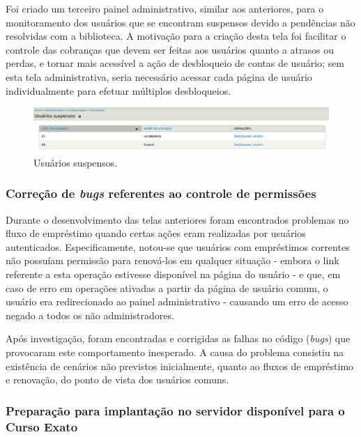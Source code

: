 \documentclass[a4paper]{article}
\begin{document}
Foi criado um terceiro painel administrativo, similar aos anteriores, para o monitoramento dos usuários que se encontram suspensos devido a pendências não resolvidas com a biblioteca. A motivação para a criação desta tela foi facilitar o controle das cobranças que devem ser feitas aos usuários quanto a atrasos ou perdas, e tornar mais acessível a ação de desbloqueio de contas de usuário; sem esta tela administrativa, seria necessário acessar cada página de usuário individualmente para efetuar múltiplos desbloqueios.

\begin{figure}[pbth!]
\centering
\includegraphics[width=120mm]{img/suspended-users.png}
\caption{Usuários suspensos.\label{suspended-users}}
\end{figure}

\subsubsection{Correção de \textit{bugs} referentes ao controle de permissões}
    
Durante o desenvolvimento das telas anteriores foram encontrados problemas no fluxo de empréstimo quando certas ações eram realizadas por usuários autenticados. Especificamente, notou-se que usuários com empréstimos correntes não possuíam permissão para renová-los em qualquer situação - embora o link referente a esta operação estivesse disponível na página do usuário - e que, em caso de erro em operações ativadas a partir da página de usuário comum, o usuário era redirecionado ao painel administrativo - causando um erro de acesso negado a todos os não administradores.

Após investigação, foram encontradas e corrigidas as falhas no código (\textit{bugs}) que provocaram este comportamento inesperado. A causa do problema consistiu na existência de cenários não previstos inicialmente, quanto ao fluxos de empréstimo e renovação, do ponto de vista dos usuários comuns.

\subsubsection{Preparação para implantação no servidor disponível para o Curso Exato}
\end{document}
